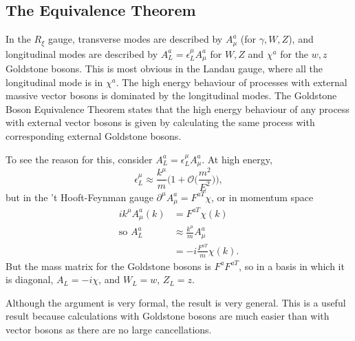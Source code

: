 \subsection{The Equivalence Theorem}
%
In the $R_\xi$ gauge, transverse modes are described by $A_\mu^a$ (for $\gamma, W, Z$), and longitudinal modes are described by $A_L^a = \epsilon_L^\mu A_\mu^a$ for $W, Z$ and $\chi^a$ for the $w, z$ Goldstone bosons. This is most obvious in the Landau gauge, where all the longitudinal mode is in $\chi^a$. The high energy behaviour of processes with external massive vector bosons is dominated by the longitudinal modes. The Goldstone Boson Equivalence Theorem states that the high energy behaviour of any process with external vector bosons is given by calculating the same process with corresponding external Goldstone bosons. 

To see the reason for this, consider $A_L^a = \epsilon_L^\mu A_\mu^a$.  At high energy, 
\begin{equation}
\epsilon_L^\mu \approx \frac{k^\mu}{m}\bigg(1 + \mathcal{O}\bigg(\frac{m^2}{E^2}\bigg)\bigg),
\end{equation}
but in the 't Hooft-Feynman gauge $\partial^\mu A_\mu^a = F^{a T} \chi$, or in momentum space
\begin{equation}
\begin{split}
ik^\mu A_\mu^a(k) &= F^{a T}\chi(k) \\
\text{so } A_L^a &\approx \frac{k^\mu}{m}A_\mu^a \\
&=-i\frac{F^{a T}}{m} \chi(k).
\end{split}
\end{equation}
But the mass matrix for the Goldstone bosons is $F^a F^{a T}$, so in a basis in which it is diagonal, $A_L = -i\chi$, and $W_L = w$, $Z_L = z$. 

Although the argument is very formal, the result is very general. This is a useful result because calculations with Goldstone bosons are much easier than with vector bosons as there are no large cancellations. 

